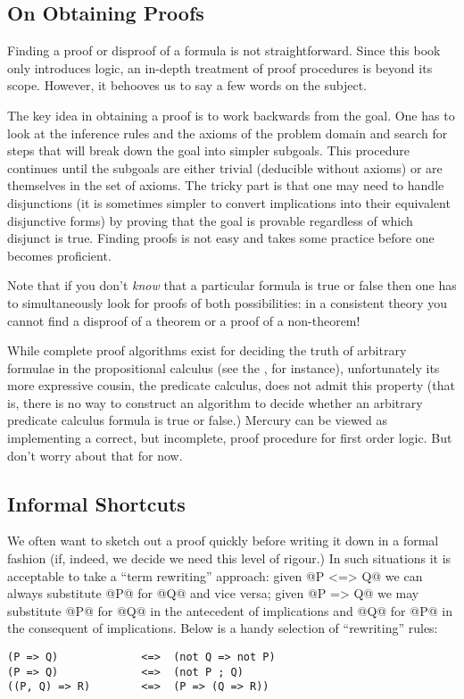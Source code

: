 \begin{itemize}
\subsection{On Obtaining Proofs}

Finding a proof or disproof of a formula is not straightforward.  Since
this book only introduces logic, an in-depth treatment of proof
procedures is beyond its scope.  However, it behooves us to say a few
words on the subject.

The key idea in obtaining a proof is to work backwards from the goal.
One has to look at the inference rules and the axioms of the problem
domain and search for steps that will break down the goal into simpler
subgoals.  This procedure continues until the subgoals are either
trivial (deducible without axioms) or are themselves in the set of
axioms.  The tricky part is that one may need to handle disjunctions (it
is sometimes simpler to convert implications into their equivalent
disjunctive forms) by proving that the goal is provable regardless of
which disjunct is true.  Finding proofs is not easy and takes some
practice before one becomes proficient.

Note that if you don't \emph{know} that a particular formula is true or
false then one has to simultaneously look for proofs of both
possibilities: in a consistent theory you cannot find a disproof of a
theorem or a proof of a non-theorem!

While complete proof algorithms exist for deciding the truth of
arbitrary formulae in the propositional calculus (see the
, for instance), unfortunately its more
expressive cousin, the predicate calculus, does not admit this property
(that is, there is no way to construct an algorithm to decide whether an
arbitrary predicate calculus formula is true or false.)  Mercury can be
viewed as implementing a correct, but incomplete, proof procedure for
first order logic.  But don't worry about that for now.

\subsection{Informal Shortcuts}

We often want to sketch out a proof quickly before writing it down in a
formal fashion (if, indeed, we decide we need this level of rigour.)  In
such situations it is acceptable to take a ``term rewriting'' approach:
given @P <=> Q@ we can always substitute @P@ for @Q@ and vice versa;
given @P => Q@ we may substitute @P@ for @Q@ in the antecedent of
implications and @Q@ for @P@ in the consequent of implications.  Below
is a handy selection of ``rewriting'' rules:
\begin{verbatim}
(P => Q)             <=>  (not Q => not P)
(P => Q)             <=>  (not P ; Q)
((P, Q) => R)        <=>  (P => (Q => R))


\end{verbatim}
\end{itemize}

